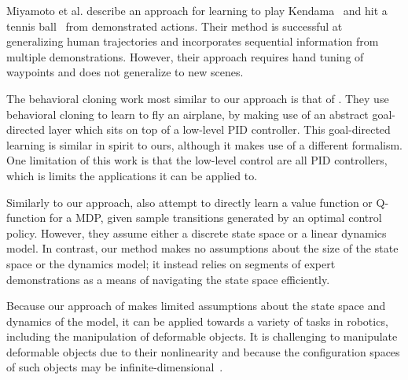 Miyamoto et al. describe an approach for learning to play Kendama~\cite{Miyamoto_1996} and hit a tennis ball~\cite{Miyamoto_1998} from demonstrated actions. 
Their method is successful at generalizing human trajectories and incorporates sequential information from multiple demonstrations.
However, their approach requires hand tuning of waypoints and does not generalize to new scenes.

The behavioral cloning work most similar to our approach is that of \citet{Isaac_ICML2003}.
They use behavioral cloning to learn to fly an airplane, by making use of an abstract goal-directed layer which sits on top of a low-level PID controller.
This goal-directed learning is similar in spirit to ours, although it makes use of a different formalism.
One limitation of this work is that the low-level control are all PID controllers, which is 
limits the applications it can be applied to.

Similarly to our approach, \citet{Dvijotham_ICML2010} also attempt to directly
learn a value function or Q-function for a MDP, given sample transitions
generated by an optimal control policy. However, they assume either a discrete
state space or a linear dynamics model. In contrast, our method makes no
assumptions about the size of the state space or the dynamics model; it instead
relies on segments of expert demonstrations as a means of navigating the state
space efficiently. 


 
Because our approach of \mmql{} makes limited assumptions about the state space
and dynamics of the model, it can be applied towards a variety of tasks
in robotics, including the manipulation of deformable objects.
It is challenging to manipulate deformable objects due to their nonlinearity
and because the configuration spaces of such objects may be
infinite-dimensional~\cite{Lamiraux_IJRR2001}.

